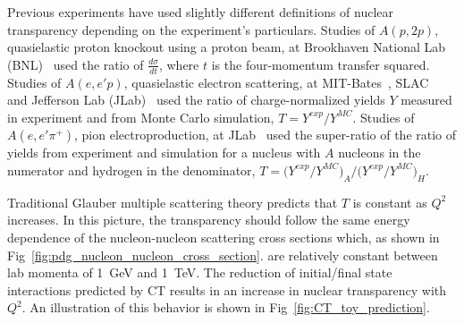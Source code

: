 Previous experiments have used slightly different definitions of nuclear
transparency depending on the experiment's particulars.
Studies of $A(p,2p)$, quasielastic proton knockout using a proton beam,
at Brookhaven National Lab (BNL)~\cite{Carroll_1988, Mardor_1998, Leksanov_2001, Aclander_2004}
used the ratio of $\frac{d\sigma}{dt}$,
where $t$ is the four-momentum transfer squared.
Studies of $A(e,e'p)$, quasielastic electron scattering,
at MIT-Bates~\cite{Garino_1992},
SLAC~\cite{Makins_1994, ONeill_1995}
and Jefferson Lab (JLab)~\cite{Abbot_1998, Garrow_2002, Rohe_2005}
used the ratio of charge-normalized yields $Y$ measured in experiment
and from Monte Carlo simulation, $T=Y^{exp}/Y^{MC}$.
Studies of $A(e,e'\pi^+)$, pion electroproduction,
at JLab~\cite{Clasie_2007, Qian_2010}
used the super-ratio of the ratio of yields from experiment and simulation
for a nucleus with $A$ nucleons in the numerator and hydrogen in the
denominator,
$T= \big(Y^{exp}/Y^{MC}\big)_{A} / \big(Y^{exp}/Y^{MC}\big)_{H}$.


Traditional Glauber multiple scattering theory predicts that $T$ is constant as
$Q^2$ increases.
In this picture, the transparency should follow the same
energy dependence of the nucleon-nucleon scattering cross sections which,
as shown in Fig~\ref{fig:pdg_nucleon_nucleon_cross_section}.
are relatively constant between lab momenta of
\SI{1}{\giga\electronvolt} and \SI{1}{\tera\electronvolt}.
The reduction of initial/final state interactions predicted by CT results in an
increase in nuclear transparency with $Q^2$.
An illustration of this behavior is shown in Fig~\ref{fig:CT_toy_prediction}.


